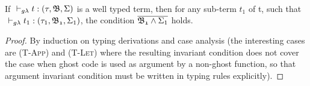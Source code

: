 \begin{lemma} ~\\
If $\typrule{t}{\tau}{\mf{B}}{\Sigma}$ is a well typed term, 
then for any sub-term $t_{1}$ of t, such that 
\mbox{$\typrule{t_{1}}{\tau_{1}}{\mf{B_{1}}}{\Sigma_{1}}$}, 
the condition $\overline{\mathfrak{B_{1}} \wedge \Sigma_{1}}$ 
holds.
\end{lemma}
\begin{proof}
By induction on typing derivations and case analysis
(the interesting cases are (\textsc{T-App}) and (\textsc{T-Let}) where the resulting invariant condition does not cover the case when ghost code
is used as argument by a non-ghost function,
so that argument invariant condition must be 
written in typing rules explicitly).
\end{proof}



%
%										
%
%
%

